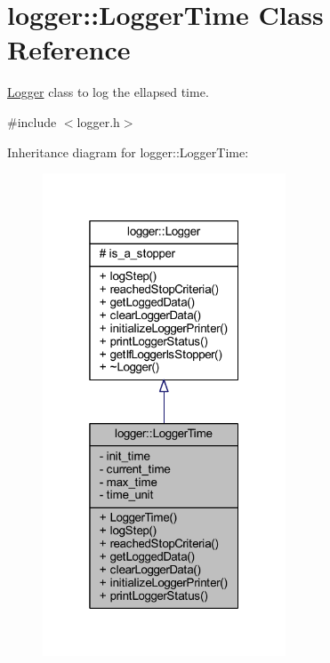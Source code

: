 \hypertarget{classlogger_1_1_logger_time}{}\section{logger\+:\+:Logger\+Time Class Reference}
\label{classlogger_1_1_logger_time}


\mbox{\hyperlink{classlogger_1_1_logger}{Logger}} class to log the ellapsed time.  




{\ttfamily \#include $<$logger.\+h$>$}



Inheritance diagram for logger\+:\+:Logger\+Time\+:
\nopagebreak
\begin{figure}[H]
\begin{center}
\leavevmode
\includegraphics[width=205pt]{classlogger_1_1_logger_time__inherit__graph}
\end{center}
\end{figure}



